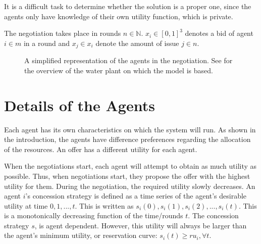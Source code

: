 It is a difficult task to determine whether the solution is a proper one, since the agents only have knowledge of their own utility function, which is private. 

The negotiation takes place in rounds $n\in \mathbb{N} $. ${x}_i \in [0,1]^3$ denotes a bid of agent $i \in m$ in a round and $x_{j}\in {x}_i$  denote the amount of issue $j \in n$. 



\begin{figure}
	\centering
	\caption{A simplified representation of the agents in the negotiation. See  for the overview of the water plant on which the model is based.}
	\label{fig:agent-plant}
\end{figure}

\section{Details of the Agents}
Each agent has its own characteristics on which the system will run. As shown in the introduction, the agents have difference preferences regarding the allocation of the resources. An offer has a different utility for each agent. 

When the negotiations start, each agent will attempt to obtain as much utility as possible. Thus, when negotiations start, they propose the offer with the highest utility for them. During the negotiation, the required utility slowly decreases. An agent $i$'s concession strategy is defined as a time series of the agent's desirable utility at time $0,1,...,t$. This is written as $s_i(0), s_i(1), s_i(2),..., s_i(t)$.  This is a monotonically decreasing function of the time/rounds $t$. The concession strategy $s$, is agent dependent. However, this utility will always be larger than the agent's minimum utility, or reservation curve: $s_i(t) \geq ru_i, \forall t$.

